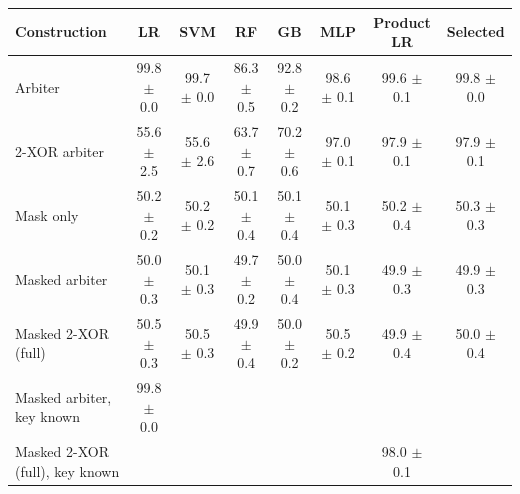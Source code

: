 \begin{tabular}{lccccccc}
\toprule
Construction & LR & SVM & RF & GB & MLP & Product LR & Selected \\
\midrule
Arbiter & 99.8 $\pm$ 0.0 & 99.7 $\pm$ 0.0 & 86.3 $\pm$ 0.5 & 92.8 $\pm$ 0.2 & 98.6 $\pm$ 0.1 & 99.6 $\pm$ 0.1 & 99.8 $\pm$ 0.0 \\
2-XOR arbiter & 55.6 $\pm$ 2.5 & 55.6 $\pm$ 2.6 & 63.7 $\pm$ 0.7 & 70.2 $\pm$ 0.6 & 97.0 $\pm$ 0.1 & 97.9 $\pm$ 0.1 & 97.9 $\pm$ 0.1 \\
Mask only & 50.2 $\pm$ 0.2 & 50.2 $\pm$ 0.2 & 50.1 $\pm$ 0.4 & 50.1 $\pm$ 0.4 & 50.1 $\pm$ 0.3 & 50.2 $\pm$ 0.4 & 50.3 $\pm$ 0.3 \\
Masked arbiter & 50.0 $\pm$ 0.3 & 50.1 $\pm$ 0.3 & 49.7 $\pm$ 0.2 & 50.0 $\pm$ 0.4 & 50.1 $\pm$ 0.3 & 49.9 $\pm$ 0.3 & 49.9 $\pm$ 0.3 \\
Masked 2-XOR (full) & 50.5 $\pm$ 0.3 & 50.5 $\pm$ 0.3 & 49.9 $\pm$ 0.4 & 50.0 $\pm$ 0.2 & 50.5 $\pm$ 0.2 & 49.9 $\pm$ 0.4 & 50.0 $\pm$ 0.4 \\
\midrule
Masked arbiter, key known & 99.8 $\pm$ 0.0 &  &  &  &  &  &  \\
Masked 2-XOR (full), key known &  &  &  &  &  & 98.0 $\pm$ 0.1 &  \\
\bottomrule
\end{tabular}
